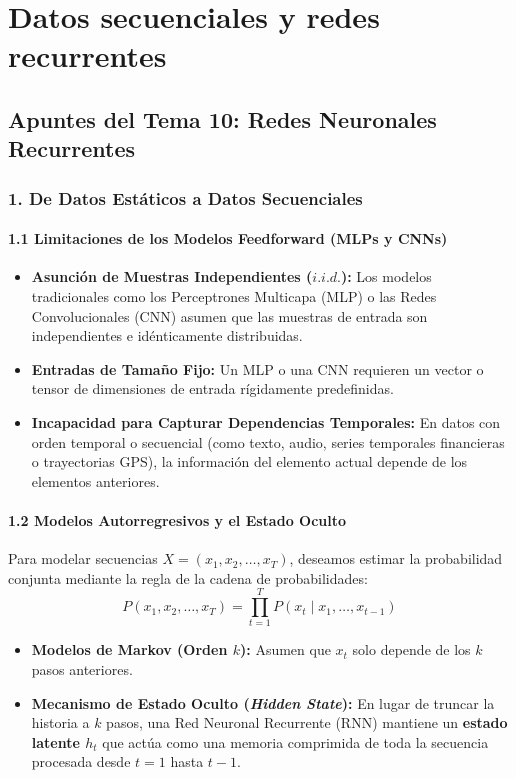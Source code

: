 \chapter{Datos secuenciales y redes recurrentes}
\section{Apuntes del Tema 10: Redes Neuronales Recurrentes}

\subsection{1. De Datos Estáticos a Datos Secuenciales}

\subsubsection{1.1 Limitaciones de los Modelos Feedforward (MLPs y CNNs)}

\begin{itemize}
	\item \textbf{Asunción de Muestras Independientes ($i.i.d.$):} Los modelos tradicionales como los Perceptrones Multicapa (MLP) o las Redes Convolucionales (CNN) asumen que las muestras de entrada son independientes e idénticamente distribuidas.
	
	\item \textbf{Entradas de Tamaño Fijo:} Un MLP o una CNN requieren un vector o tensor de dimensiones de entrada rígidamente predefinidas.
	
	\item \textbf{Incapacidad para Capturar Dependencias Temporales:} En datos con orden temporal o secuencial (como texto, audio, series temporales financieras o trayectorias GPS), la información del elemento actual depende de los elementos anteriores.
\end{itemize}

\subsubsection{1.2 Modelos Autorregresivos y el Estado Oculto}

Para modelar secuencias $X = (x_1, x_2, \dots, x_T)$, deseamos estimar la probabilidad conjunta mediante la regla de la cadena de probabilidades:
$$P(x_1, x_2, \dots, x_T) = \prod_{t=1}^{T} P(x_t \mid x_1, \dots, x_{t-1})$$

\begin{itemize}
	\item \textbf{Modelos de Markov (Orden $k$):} Asumen que $x_t$ solo depende de los $k$ pasos anteriores.
	
	\item \textbf{Mecanismo de Estado Oculto (\emph{Hidden State}):} En lugar de truncar la historia a $k$ pasos, una Red Neuronal Recurrente (RNN) mantiene un \textbf{estado latente $h_t$} que actúa como una memoria comprimida de toda la secuencia procesada desde $t=1$ hasta $t-1$.
\end{itemize}


